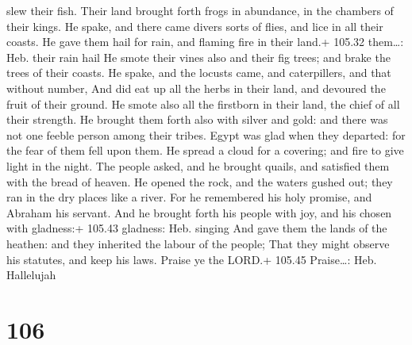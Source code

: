 slew their fish.  Their land brought forth frogs in
abundance, in the chambers of their kings.  He spake, and
there came divers sorts of flies, and lice in all their coasts.
 He gave them hail for rain, and flaming fire in their
land.+ 105.32 them\ldots: Heb. their rain hail  He smote
their vines also and their fig trees; and brake the trees of their
coasts.  He spake, and the locusts came, and caterpillers,
and that without number,  And did eat up all the herbs in
their land, and devoured the fruit of their ground.  He
smote also all the firstborn in their land, the chief of all their
strength.  He brought them forth also with silver and gold:
and there was not one feeble person among their tribes. 
Egypt was glad when they departed: for the fear of them fell upon them.
 He spread a cloud for a covering; and fire to give light
in the night.  The people asked, and he brought quails, and
satisfied them with the bread of heaven.  He opened the
rock, and the waters gushed out; they ran in the dry places like a
river.  For he remembered his holy promise, and Abraham his
servant.  And he brought forth his people with joy, and his
chosen with gladness:+ 105.43 gladness: Heb. singing  And
gave them the lands of the heathen: and they inherited the labour of the
people;  That they might observe his statutes, and keep his
laws. Praise ye the LORD.+ 105.45 Praise\ldots: Heb. Hallelujah

\hypertarget{section-105}{%
\section{106}\label{section-105}}

